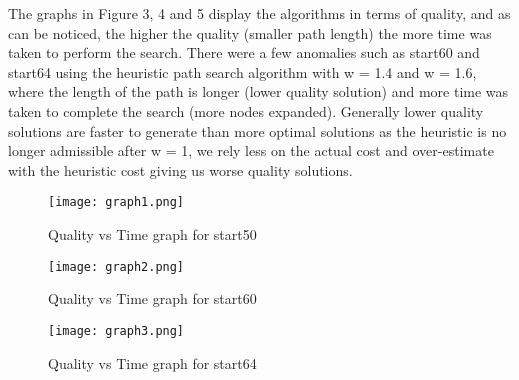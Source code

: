 \documentclass{article}
\begin{document}
\begin{enumerate}[a)]
The graphs in Figure 3, 4 and 5 display the algorithms in terms of quality, and as can be noticed, the higher the quality (smaller path length) the more time was taken to perform the search. There were a few anomalies such as start60 and start64 using the heuristic path search algorithm with w = 1.4 and w = 1.6, where the length of the path is longer (lower quality solution) and more time was taken to complete the search (more nodes expanded). Generally lower quality solutions are faster to generate than more optimal solutions as the heuristic is no longer admissible after w = 1, we rely less on the actual cost and over-estimate with the heuristic cost giving us worse quality solutions.

\begin{figure}[h!]
      \begin{center}
            \texttt{[image: graph1.png]}
      \end{center}
            \caption{Quality vs Time graph for start50}
\end{figure}

\begin{figure}[h!]
      \begin{center}
            \texttt{[image: graph2.png]}
      \end{center}
            \caption{Quality vs Time graph for start60}
\end{figure}

\begin{figure}[h!]
      \begin{center}
            \texttt{[image: graph3.png]}
      \end{center}
            \caption{Quality vs Time graph for start64}
\end{figure}

\end{enumerate}
\end{document}
